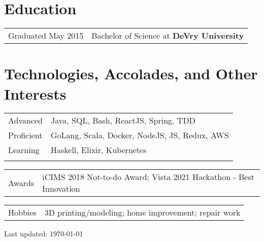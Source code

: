 \documentclass[a4paper,11pt]{article}
\begin{document}
\section{Education}
\begin{tabularx}{\linewidth}{@{}l X@{}}	
Graduated May 2015 & Bachelor of Science at \textbf{DeVry University} \hfill \normalsize \\

\end{tabularx}

\section{Technologies, Accolades, and Other Interests}
\begin{tabularx}{\linewidth}{@{}l X@{}}
Advanced &  \normalsize{Java, SQL, Bash, ReactJS, Spring, TDD}\\
Proficient  &  \normalsize{GoLang, Scala, Docker, NodeJS, JS, Redux, AWS}\\
Learning & \normalsize{Haskell, Elixir, Kubernetes}\\
\newline
\end{tabularx}
\begin{tabularx}{\linewidth}{@{}l X@{}}
Awards &  \normalsize{iCIMS 2018 Not-to-do Award; Vista 2021 Hackathon - Best Innovation}\\ 
\end{tabularx}
\begin{tabularx}{\linewidth}{@{}l X@{}}
Hobbies &  \normalsize{3D printing/modeling; home improvement; repair work}\\ 
\end{tabularx}

\vfill
{\footnotesize Last updated: \today}
\end{document}
